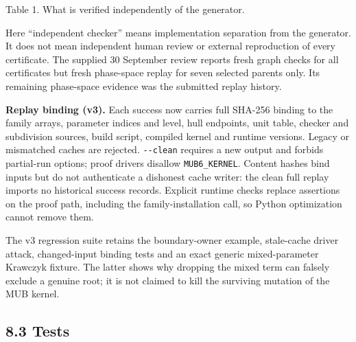 \documentclass[
  11pt,
]{article}
\begin{document}
Table 1. What is verified independently of the generator.

Here ``independent checker'' means implementation separation from the
generator. It does not mean independent human review or external
reproduction of every certificate. The supplied 30 September review
reports fresh graph checks for all certificates but fresh phase-space
replay for seven selected parents only. Its remaining phase-space
evidence was the submitted replay history.

\textbf{Replay binding (v3).} Each success now carries full SHA-256
binding to the family arrays, parameter indices and level, hull
endpoints, unit table, checker and subdivision sources, build script,
compiled kernel and runtime versions. Legacy or mismatched caches are
rejected. \texttt{-\/-clean} requires a new output and forbids
partial-run options; proof drivers disallow \texttt{MUB6\_KERNEL}.
Content hashes bind inputs but do not authenticate a dishonest cache
writer: the clean full replay imports no historical success records.
Explicit runtime checks replace assertions on the proof path, including
the family-installation call, so Python optimization cannot remove them.

The v3 regression suite retains the boundary-owner example, stale-cache
driver attack, changed-input binding tests and an exact generic
mixed-parameter Krawczyk fixture. The latter shows why dropping the
mixed term can falsely exclude a genuine root; it is not claimed to kill
the surviving mutation of the MUB kernel.

\subsection{8.3 Tests}\label{tests}
\end{document}
